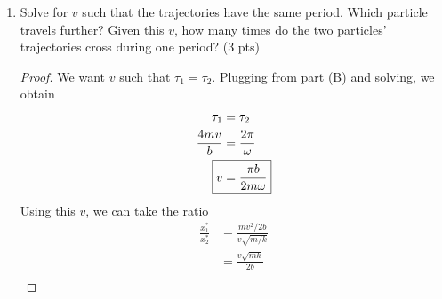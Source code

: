 \documentclass[../psets.tex]{subfiles}
\begin{document}
\begin{enumerate}
\begin{enumerate}
\begin{proof}
            As stated above, the period of the first particle is
            \begin{equation*}
                \boxed{\tau_1 = \frac{4mv}{b}}
            \end{equation*}
            From class, the period of the second particle is
            \begin{equation*}
                \boxed{\tau_2 = \frac{2\pi}{\omega}}
            \end{equation*}
            where $\omega$ is defined as above.\par\medskip
            The total energy of the system is wholly kinetic when the particle is at the origin. Thus, the total energy of each system is $mv^2/2$. Additionally, the particle is stationary under such monotonic concave potentials at the points where kinetic energy is converted entirely to potential. That is, for the first particle, where
            \begin{align*}
                \frac{1}{2}mv^2 &= b|x_1^*|\\
                \Aboxed{x_1^* &= \pm\frac{mv^2}{2b}}
            \end{align*}
            and for the second particle, where
            \begin{align*}
                \frac{1}{2}mv^2 &= \frac{1}{2}k(x_2^*)^2\\
                \Aboxed{x_2^* &= \pm v\sqrt{\frac{m}{k}}}
            \end{align*}
        \end{proof}
        \item Solve for $v$ such that the trajectories have the same period. Which particle travels further? Given this $v$, how many times do the two particles' trajectories cross during one period? (3 pts)
        \begin{proof}
            We want $v$ such that $\tau_1=\tau_2$. Plugging from part (B) and solving, we obtain
            \begin{align*}
                \tau_1 &= \tau_2\\
                \frac{4mv}{b} &= \frac{2\pi}{\omega}\\
                \Aboxed{v &= \frac{\pi b}{2m\omega}}
            \end{align*}
            Using this $v$, we can take the ratio
            \begin{align*}
                \frac{x_1^*}{x_2^*} &= \frac{mv^2/2b}{v\sqrt{m/k}}\\
                &= \frac{v\sqrt{mk}}{2b}\\

\end{align*}
\end{proof}
\end{enumerate}
\end{enumerate}
\end{document}
